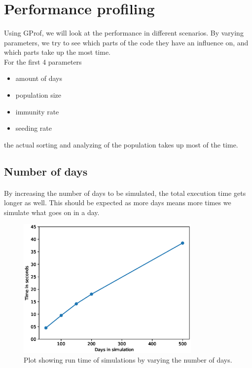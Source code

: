 \documentclass[runningheads]{llncs}
\begin{document}
\clearpage
\section{Performance profiling}

\paragraph{} Using GProf, we will look at the performance in different scenarios. By varying parameters, we try to see which parts of the code they have an influence on, and which parts take up the most time. 
\\
For the first 4 parameters
\begin{itemize}
	\item amount of days
	\item population size
	\item immunity rate
	\item seeding rate
\end{itemize}
the actual sorting and analyzing of the population takes up most of the time.

\subsection{Number of days}

\paragraph{} By increasing the number of days to be simulated, the total execution time gets longer as well. This should be expected as more days means more times we simulate what goes on in a day.
\begin{figure}[h!]
\centering
	\includegraphics[width=0.8\textwidth]{3_GProf_numdays.eps}
	\caption{Plot showing run time of simulations by varying the number of days.} 
	\label{Gprof_numdays}
\end{figure}
\end{document}

